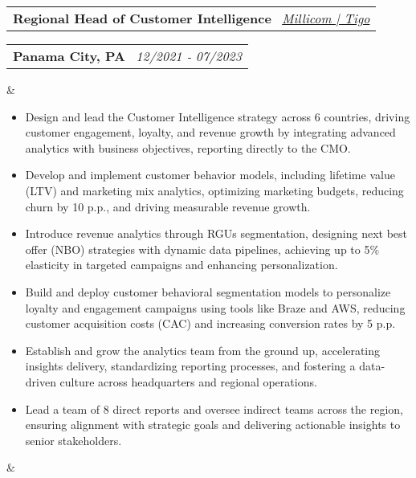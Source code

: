 \documentclass[11pt,a4paper,sans]{moderncv}
\makeatletter
\newcommand*{\customcventry}[7][.13em]{
\begin{tabular}{@{}l}
{\bfseries #4} \
{\itshape #3}
\end{tabular}
\hfill
\begin{tabular}{l@{}}
{\bfseries #5} \
{\itshape #2}
\end{tabular}
\ifx&#7&%
\else{\ %
\begin{minipage}{\maincolumnwidth}%
\small#7%
\end{minipage}}\fi%
\par\addvspace{#1}}
\makeatother
\begin{document}
\customcventry{12/2021 ‐ 07/2023}{\color{blue}\href{https://www.millicom.com/}{Millicom | Tigo}}{Regional Head of Customer Intelligence}{Panama City, PA}{}{{
\begin{itemize}[leftmargin=0.6cm, label={\textbullet}, itemsep=-0.2em]
\item Design and lead the Customer Intelligence strategy across 6 countries, driving customer engagement, loyalty, and revenue growth by integrating advanced analytics with business objectives, reporting directly to the CMO.
\item Develop and implement customer behavior models, including lifetime value (LTV) and marketing mix analytics, optimizing marketing budgets, reducing churn by 10 p.p., and driving measurable revenue growth.
\item Introduce revenue analytics through RGUs segmentation, designing next best offer (NBO) strategies with dynamic data pipelines, achieving up to 5\% elasticity in targeted campaigns and enhancing personalization.
\item Build and deploy customer behavioral segmentation models to personalize loyalty and engagement campaigns using tools like Braze and AWS, reducing customer acquisition costs (CAC) and increasing conversion rates by 5 p.p.
\item Establish and grow the analytics team from the ground up, accelerating insights delivery, standardizing reporting processes, and fostering a data-driven culture across headquarters and regional operations.
\item Lead a team of 8 direct reports and oversee indirect teams across the region, ensuring alignment with strategic goals and delivering actionable insights to senior stakeholders.
\end{itemize}
\vspace{-0.1em}
}}
\end{document}
